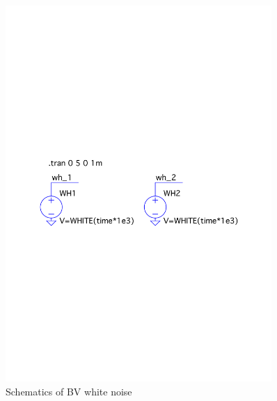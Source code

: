 \documentclass[12pt,a4paper,UKenglish]{article}
\begin{document}
\begin{figure} [H]
  \centering 
  \includegraphics[width=0.9\textwidth]{img/sch_5a.pdf} 
  \caption{Schematics of BV white noise}
  \label{sch_5a} 
\end{figure}
\end{document}
